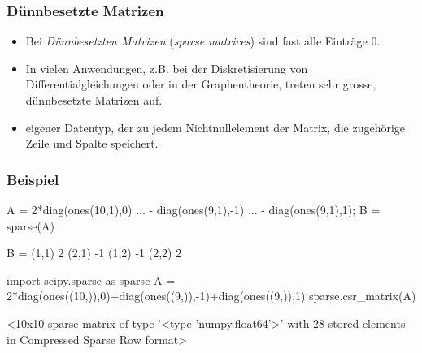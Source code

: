\documentclass[hyperref={xetex}]{beamer}
\begin{document}
% 
%
\begin{frame}[fragile]\frametitle{D\"unnbesetzte Matrizen}
\begin{itemize}
\item Bei {\it D\"unnbesetzten Matrizen} ({\it sparse matrices}) sind
  fast alle Eintr\"age $0$.
\item In vielen Anwendungen, z.B. bei der Diskretisierung von
  Differentialgleichungen oder in der Graphentheorie, treten sehr
  grosse, d\"unnbesetzte  Matrizen auf.
\item eigener Datentyp, der zu
  jedem Nichtnullelement der Matrix, die zugeh\"orige Zeile und Spalte
  speichert.    
\end{itemize}
\end{frame}
% 
%
\begin{frame}[fragile]\frametitle{Beispiel}
\begin{matlabin}
A = 2*diag(ones(10,1),0) ...
       - diag(ones(9,1),-1) ...
       - diag(ones(9,1),1);
B = sparse(A)
\end{matlabin}
\begin{matlab}
B =   (1,1)        2
      (2,1)       -1
      (1,2)       -1
      (2,2)        2
\end{matlab}
\begin{pyin}
import scipy.sparse as sparse
A = 2*diag(ones((10,)),0)+diag(ones((9,)),-1)+diag(ones((9,)),1)
sparse.csr_matrix(A)
\end{pyin}
\begin{pyout}
<10x10 sparse matrix of type '<type 'numpy.float64'>'
  with 28 stored elements in Compressed Sparse Row format>
\end{pyout}
\end{frame}
% 
%
\end{document}
